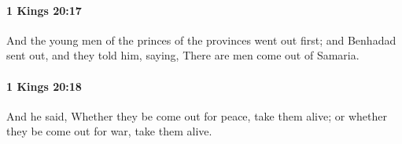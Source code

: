 		\paragraph{1 Kings 20:17} %
			\label{1KINGS-20-17}

			And the young men of the princes of the provinces went out first; and Benhadad sent out, and they told him, saying, There are men come out of Samaria.


		\paragraph{1 Kings 20:18} %
			\label{1KINGS-20-18}

			And he said, Whether they be come out for peace, take them alive; or whether they be come out for war, take them alive.


